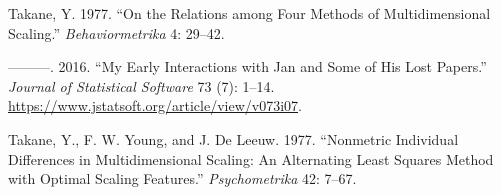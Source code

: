 \documentclass[
  12pt,
  letterpaper,
  DIV=11,
  numbers=noendperiod]{scrartcl}
\newlength{\cslhangindent}
\newenvironment{CSLReferences}[2] %
 {\begin{list}{}{%
  \setlength{\itemindent}{0pt}
  \setlength{\leftmargin}{0pt}
  \setlength{\parsep}{0pt}
  \ifodd #1
   \setlength{\leftmargin}{\cslhangindent}
   \setlength{\itemindent}{-1\cslhangindent}
  \fi
  \setlength{\itemsep}{#2\baselineskip}}}
 {\end{list}}
\begin{document}
\begin{CSLReferences}{1}{0}
Takane, Y. 1977. {``{On the Relations among Four Methods of
Multidimensional Scaling}.''} \emph{Behaviormetrika} 4: 29--42.

---------. 2016. {``{My Early Interactions with Jan and Some of His Lost
Papers}.''} \emph{Journal of Statistical Software} 73 (7): 1--14.
\url{https://www.jstatsoft.org/article/view/v073i07}.

Takane, Y., F. W. Young, and J. De Leeuw. 1977. {``Nonmetric Individual
Differences in Multidimensional Scaling: An Alternating Least Squares
Method with Optimal Scaling Features.''} \emph{Psychometrika} 42: 7--67.

\end{CSLReferences}
\end{document}
